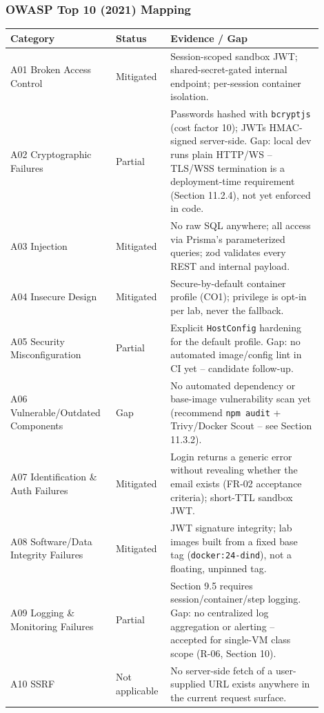 \documentclass[11pt]{article}
\begin{document}
\subsubsection{OWASP Top 10 (2021) Mapping}
\begin{longtable}{@{}p{0.30\linewidth}p{0.14\linewidth}p{0.46\linewidth}@{}}
\toprule
\textbf{Category} & \textbf{Status} & \textbf{Evidence / Gap} \\
\midrule
\endhead
A01 Broken Access Control & Mitigated & Session-scoped sandbox JWT;
      shared-secret-gated internal endpoint; per-session container
      isolation. \\
A02 Cryptographic Failures & Partial & Passwords hashed with
      \texttt{bcryptjs} (cost factor 10); JWTs HMAC-signed
      server-side. Gap: local dev runs plain HTTP/WS -- TLS/WSS
      termination is a deployment-time requirement (Section 11.2.4),
      not yet enforced in code. \\
A03 Injection & Mitigated & No raw SQL anywhere; all access via
      Prisma's parameterized queries; zod validates every REST and
      internal payload. \\
A04 Insecure Design & Mitigated & Secure-by-default container profile
      (CO1); privilege is opt-in per lab, never the fallback. \\
A05 Security Misconfiguration & Partial & Explicit \texttt{HostConfig}
      hardening for the default profile. Gap: no automated
      image/config lint in CI yet -- candidate follow-up. \\
A06 Vulnerable/Outdated Components & Gap & No automated dependency or
      base-image vulnerability scan yet (recommend \texttt{npm audit}
      + Trivy/Docker Scout -- see Section 11.3.2). \\
A07 Identification \& Auth Failures & Mitigated & Login returns a
      generic error without revealing whether the email exists
      (FR-02 acceptance criteria); short-TTL sandbox JWT. \\
A08 Software/Data Integrity Failures & Mitigated & JWT signature
      integrity; lab images built from a fixed base tag
      (\texttt{docker:24-dind}), not a floating, unpinned tag. \\
A09 Logging \& Monitoring Failures & Partial & Section 9.5 requires
      session/container/step logging. Gap: no centralized log
      aggregation or alerting -- accepted for single-VM class scope
      (R-06, Section 10). \\
A10 SSRF & Not applicable & No server-side fetch of a user-supplied
      URL exists anywhere in the current request surface. \\
\bottomrule
\end{longtable}
\end{document}
